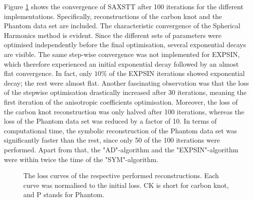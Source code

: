 Figure \ref{fig:Loss_curve_optimal} shows the convergence of SAXSTT after 100 iterations for the different implementations.
Specifically, reconstructions of the carbon knot and the Phantom data set are included.
The characteristic convergence of the Spherical Harmonics method is evident.
Since the different sets of parameters were optimised independently before the final optimisation, several exponential decays are visible.
The same step-wise convergence was not implemented for EXPSIN, which therefore experienced an initial exponential decay followed by an almost flat convergence.
In fact, only $10\%$ of the EXPSIN iterations showed exponential decay; the rest were almost flat.
Another fascinating observation was that the loss of the stepwise optimisation drastically increased after 30 iterations, meaning the first iteration of the anisotropic coefficients optimisation.
Moreover, the loss of the carbon knot reconstruction was only halved after 100 iterations, whereas the loss of the Phantom data set was reduced by a factor of 10.
In terms of computational time, the symbolic reconstruction of the Phantom data set was significantly faster than the rest, since only 50 of the 100 iterations were performed.
Apart from that, the "AD"-algorithm and the "EXPSIN"-algorithm were within twice the time of the "SYM"-algorithm.



\begin{figure}[h!]
    \centering
    \caption{ The loss curves of the respective performed reconstructions. Each curve was normalised to the initial loss.
        CK is short for carbon knot, and P stands for Phantom. }
    \label{fig:Loss_curve_optimal}
\end{figure}